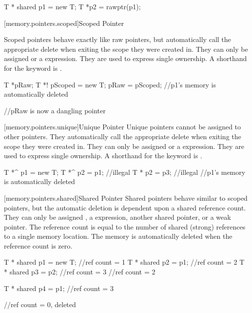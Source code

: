 \begin{codeblock}

T * shared p1 = new T;
T *p2 = rawptr(p1);

\end{codeblock}


[memory.pointers.scoped]{Scoped Pointer}

Scoped pointers behave exactly like raw pointers, but automatically call the appropriate delete when exiting the scope they were created in. They can only be assigned  or a  expression. They are used to express single ownership. A shorthand for the  keyword is \tcode{!}.

\begin{codeblock}

T *pRaw;
{
	T *! pScoped = new T;
	pRaw = pScoped;
} //p1's memory is automatically deleted

//pRaw is now a dangling pointer

\end{codeblock}

[memory.pointers.unique]{Unique Pointer}
Unique pointers cannot be assigned to other pointers. They automatically call the appropriate delete when exiting the scope they were created in. They can only be assigned  or a  expression. They are used to express single ownership. A shorthand for the  keyword is \tcode{\^}.


\begin{codeblock}
{
	T *^ p1 = new T;
	T *^ p2 = p1; //illegal
	T * p2 = p3; //illegal
} //p1's memory is automatically deleted

\end{codeblock}

[memory.pointers.shared]{Shared Pointer}
Shared pointers behave similar to scoped pointers, but the automatic deletion is dependent upon a shared reference count. They can only be assigned , a  expression, another shared pointer, or a weak pointer. The reference count is equal to the number of shared (strong) references to a single memory location. The memory is automatically deleted when the reference count is zero.

\begin{codeblock}

{
	T * shared p1 = new T;	//ref count = 1
	T * shared p2 = p1;		//ref count = 2
	{
		T * shared p3 = p2;	//ref count = 3
	} //ref count = 2

	T * shared p4 = p1;	//ref count = 3
} //ref count = 0, deleted

\end{codeblock}

